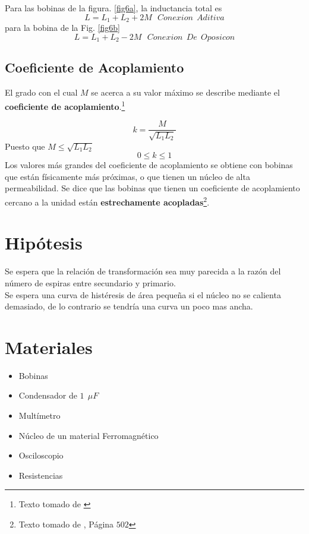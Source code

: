 \documentclass[twocolumn]{IEEEtran}
\begin{document}
\noindent
\noindent
Para las bobinas de la figura. \ref{fig6a}, la inductancia total es
\begin{equation}
 L = L_1 + L_2 + 2M\ \ \ Conexion\ \ Aditiva
\label{ecu17}
\end{equation}
\noindent
para la bobina de la Fig. \ref{fig6b}
\begin{equation}
 L = L_1 + L_2 - 2M\ \ \ Conexion\ \ De\ \ Oposicon
\label{ecu18}
\end{equation}

\subsection{Coeficiente de Acoplamiento}
\noindent
El grado con el cual $M$ se acerca a su valor máximo se describe mediante el \textbf{coeficiente de acoplamiento}.\footnote{Texto tomado de \cite{hayt}}

\begin{equation}
 k = \frac{M}{\sqrt{L_1 L_2}}
\label{ecu19}
\end{equation}
\noindent
Puesto que $M \le \sqrt{L_1L_2}$
$$0 \le k \le 1$$
\noindent
Los valores más grandes del coeficiente de acoplamiento se obtiene con bobinas que están físicamente más próximas, o que tienen un núcleo de alta permeabilidad. Se dice que las bobinas que tienen un coeficiente de acoplamiento cercano a la unidad están \textbf{estrechamente acopladas}\footnote{Texto tomado de \cite{hayt}, Página $502$}.

\section{Hipótesis}
\noindent
Se espera que la relación de transformación sea muy parecida a la razón del número de espiras entre secundario  y primario.\\
Se espera una curva de histéresis de área pequeña si el núcleo no se calienta demasiado, de lo contrario se tendría una curva un poco mas ancha.

\section{Materiales}
\begin{itemize}
 \item Bobinas
 \item Condensador de $1\ \ \mu F$
 \item Multímetro
 \item Núcleo de un material Ferromagnético
 \item Osciloscopio
 \item Resistencias
\end{itemize}
\end{document}
